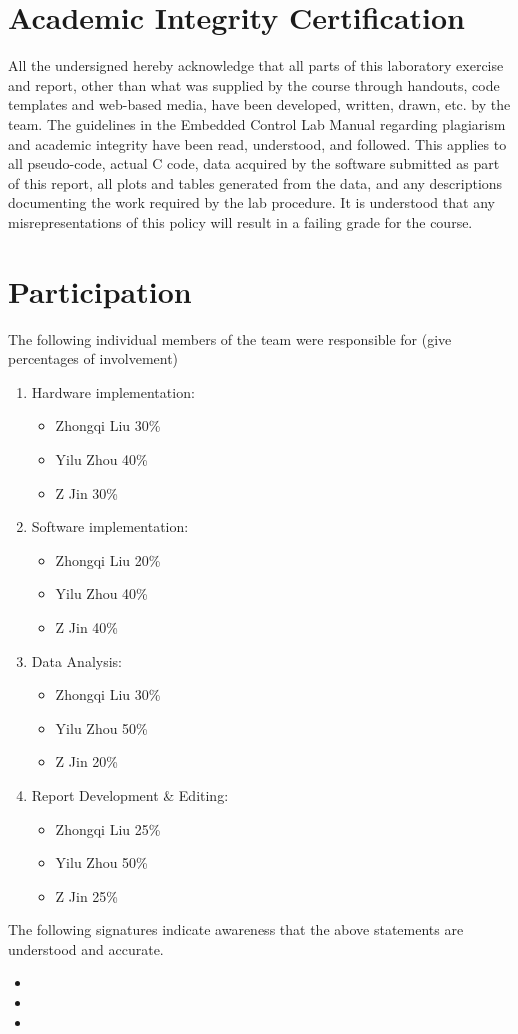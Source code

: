 \documentclass[12pt]{article}
\begin{document}
\section{Academic Integrity Certification}
All the undersigned hereby acknowledge that all parts of this laboratory exercise and report, other than what was supplied by the course through handouts, code templates and web-based media, have been developed, written, drawn, etc. by the team. The guidelines in the Embedded Control Lab Manual regarding plagiarism and academic integrity have been read, understood, and followed. This applies to all pseudo-code, actual C code, data acquired by the software submitted as part of this report, all plots and tables generated from the data, and any descriptions documenting the work required by the lab procedure. It is understood that any misrepresentations of this policy will result in a failing grade for the course.
\newpage
\section{Participation}
The following individual members of the team were responsible for (give percentages of involvement)
\begin{enumerate}
  \item Hardware implementation:
  \begin{itemize}
    \item Zhongqi Liu \hfill 30\%
    \item Yilu Zhou \hfill 40\%
    \item Z Jin \hfill 30\%
  \end{itemize} 
  \item Software implementation:
  \begin{itemize}
    \item Zhongqi Liu \hfill 20\%
    \item Yilu Zhou \hfill 40\%
    \item Z Jin \hfill 40\%
  \end{itemize}
  \item Data Analysis:
  \begin{itemize}
    \item Zhongqi Liu \hfill 30\%
    \item Yilu Zhou \hfill 50\%
    \item Z Jin \hfill 20\%
  \end{itemize}
  \item Report Development \& Editing:
  \begin{itemize}
    \item Zhongqi Liu \hfill 25\%
    \item Yilu Zhou \hfill 50\%
    \item Z Jin \hfill 25\%
  \end{itemize}
\end{enumerate}
The following signatures indicate awareness that the above statements are understood and accurate.
\begin{itemize}
  \item
  \item
  \item
\end{itemize}
\end{document}
